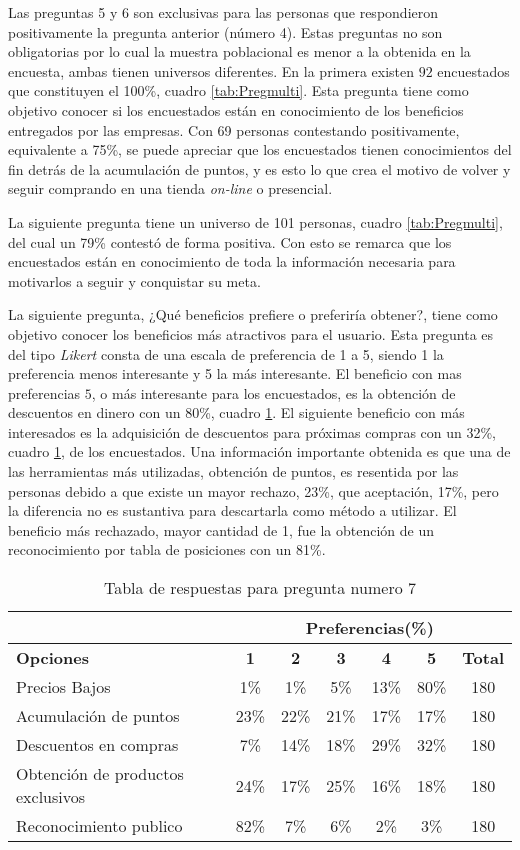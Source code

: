 Las preguntas 5 y 6 son exclusivas para las personas que respondieron positivamente
la pregunta anterior (número 4).
Estas preguntas no son obligatorias por lo cual la muestra poblacional
es menor a la obtenida en la encuesta, ambas tienen universos diferentes.
En la primera existen $92$ encuestados que constituyen el 100\%, cuadro \ref{tab:Pregmulti}.
Esta pregunta tiene como objetivo conocer si los encuestados están en conocimiento
de los beneficios entregados por las empresas.
Con 69 personas contestando positivamente, equivalente a 75\%, se puede apreciar
que los encuestados tienen conocimientos del fin detrás de la acumulación de puntos,
y es esto lo que crea el motivo de volver y seguir comprando en una tienda
\emph{on-line} o presencial.

La siguiente pregunta tiene un universo de 101 personas, cuadro \ref{tab:Pregmulti},
del cual un 79\% contestó de forma positiva.
Con esto se remarca que los encuestados están en conocimiento de toda la
información necesaria para motivarlos a seguir y conquistar su meta.

La siguiente pregunta,
¿Qué beneficios prefiere o preferiría obtener?,
tiene como objetivo conocer los  beneficios más atractivos para el usuario.
Esta pregunta es del tipo \emph{Likert} \cite{likert} consta de una escala de preferencia de
1 a 5, siendo 1 la preferencia menos interesante y 5 la más interesante.
El beneficio con mas preferencias $5$, o más interesante para los encuestados,
es la obtención de descuentos en dinero con un 80\%, cuadro \ref{tab:Preg7}.
El siguiente beneficio con más interesados es la adquisición de descuentos para
próximas compras con un 32\%, cuadro \ref{tab:Preg7}, de los encuestados.
Una información importante obtenida es que una de las herramientas más utilizadas,
obtención de puntos, es resentida por las personas debido a que existe un mayor
rechazo, 23\%, que aceptación, 17\%, pero la diferencia no es sustantiva para
descartarla como método a utilizar.
El beneficio más rechazado, mayor cantidad de 1, fue la obtención de un
reconocimiento por tabla de posiciones con un 81\%.

\begin{table}[h]
\centering
\footnotesize
\begin{tabular}{|l|c|c|c|c|c|c|}
\hline
 & \multicolumn{6}{c|}{{\bf Preferencias(\%)}} \\
\hline
{\bf Opciones} & {\bf 1} & {\bf 2} & {\bf 3} & {\bf 4} & {\bf 5} & {\bf Total}\\
\hline
Precios Bajos & 1\% & 1\% & 5\% & 13\% & 80\% & 180\\
\hline
Acumulación de puntos & 23\% & 22\% & 21\% & 17\% & 17\% & 180\\
\hline
Descuentos en compras & 7\% & 14\% & 18\% & 29\% & 32\% & 180\\
\hline
Obtención de productos exclusivos & 24\% & 17\% & 25\% & 16\% & 18\% & 180\\
\hline
Reconocimiento publico & 82\% & 7\% & 6\% & 2\% & 3\% & 180\\
\hline
\end{tabular}
\caption{Tabla de respuestas para pregunta numero 7}
\label{tab:Preg7}
\end{table}

